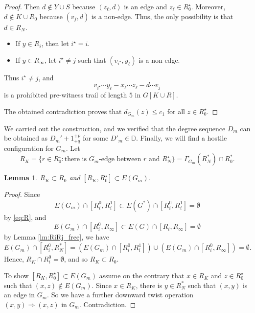 \documentclass[11pt]{elsarticle}
\theoremstyle{plain}
\newtheorem{lemma}[theorem]{Lemma}
\theoremstyle{definition}
\def\mD{\mathbb{D}}
\newcommand{\hflip}[3]{(#1,#2)\Rightarrow (#1,#3)}
\begin{document}
\begin{proof}
Then $d\notin Y\cup S$ because $(z_\ell,d)$ is an edge and $z_\ell\in R^\star_0$.
Moreover,  $d\notin K\cup R_0$ because $(v_j,d)$ is a non-edge.
Thus, the only possibility is that  $d\in R_N$.

\begin{itemize}
\item If $y\in R_i$, then let $i^\star=i$.
\item If $y\in R_\infty$, let $i^\star\ne j$ such that $(v_{i^\star},y_\ell)$ is a non-edge.
\end{itemize}
Thus $i^\star\ne j$, and
$$
v_{i^\star}\cdots y_\ell - x_\ell \cdots z_\ell-  d\cdots v_{j}
$$
is a prohibited pre-witness trail of length $5$ in $G[K\cup  R]$.

The obtained contradiction proves that $d_{G_m}(z)\le c_1$ for all $z\in R^\star_0$.
\end{proof}

We carried out the construction, and we verified that the degree sequence $D_m$ can be obtained as $D_m'+1^{+p}_{+q}$ for some $D'_m\in \mD$.
Finally, we will find a hostile configuration for $G_m$. Let
\begin{displaymath}
    R_K=\{r\in R^\star_0:
    \text{there is $G_m$-edge between $r$ and $R^\star_N$}\}=\Gamma_{G_m}(R_N^*)\cap R^*_0.
\end{displaymath}



\begin{lemma}\label{lm:observe}\label{eq:RK}
        $R_K\subset R_0$ and $[R_K,R^\star_0]\subset E(G_m)$.
\end{lemma}

\begin{proof}
    Since
    \begin{equation}\label{eq:sl1}
    E(G_m)\cap [R^0_i,R_i^1]\subset E(G^*)\cap [R^0_i,R_i^1]=\emptyset
    \end{equation}
    by  \eqref{eq:R},
    and
    \begin{equation}\label{eq:sl2}
    E(G_m)\cap [R^0_i,R_\infty]\subset E(G)\cap [R_i,R_\infty]=\emptyset
    \end{equation}
    by Lemma \ref{lm:RiRj_free}, we have
    \begin{equation}\label{eq:sl3}
    E(G_m)\cap [R^0_i,R_N^*]=(E(G_m)\cap [R^0_i,R_i^1])\cup (E(G_m)\cap [R^0_i,R_\infty])=\emptyset.
    \end{equation}
    Hence, $R_K\cap R^0_i=\emptyset$, and so $R_K\subset R_0$.


To show $[R_K,R^\star_0]\subset E(G_m)$
assume on the contrary that $x\in R_K$ and $z\in R^\star_0$ such that $(x,z)\notin E(G_m)$.
Since $x\in R_K$, there is $y\in R^*_N$ such that $(x,y)$ is an edge in $G_m$. So we have a  further  downward twist operation  $\hflip{x}{y}{z}$ in $G_m$. Contradiction.
\end{proof}
\end{document}
